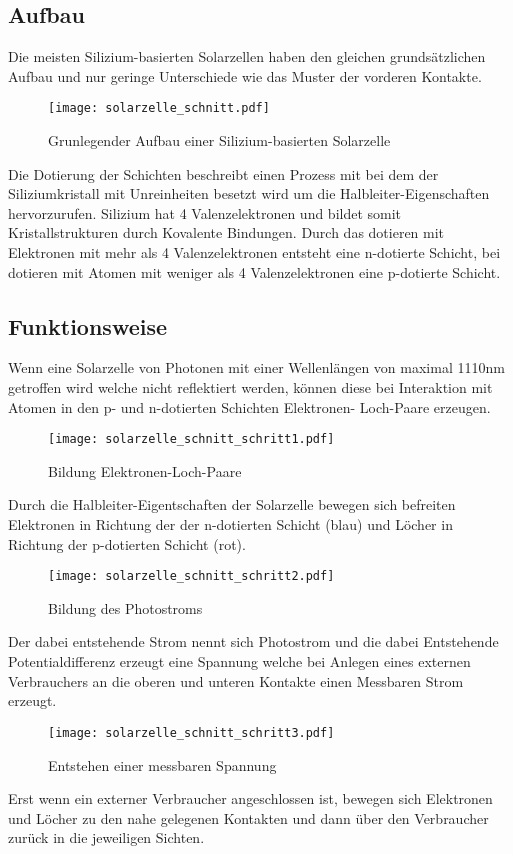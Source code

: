\subsection{Aufbau}
    Die meisten Silizium-basierten Solarzellen haben den gleichen
    grundsätzlichen Aufbau und nur geringe Unterschiede wie das Muster
    der vorderen Kontakte.
    \begin{figure}[H]
        \centering
        \texttt{[image: solarzelle\_schnitt.pdf]}
        \caption{Grunlegender Aufbau einer Silizium-basierten Solarzelle}
    \end{figure}
    Die Dotierung der Schichten beschreibt einen
    Prozess mit bei dem der Siliziumkristall mit Unreinheiten besetzt
    wird um die Halbleiter-Eigenschaften hervorzurufen. Silizium hat
    4 Valenzelektronen und bildet somit Kristallstrukturen durch Kovalente
    Bindungen. Durch das dotieren mit Elektronen mit mehr als 4
    Valenzelektronen entsteht eine n-dotierte Schicht, bei dotieren mit
    Atomen mit weniger als 4 Valenzelektronen eine p-dotierte Schicht.

\subsection{Funktionsweise}
    Wenn eine Solarzelle von Photonen mit einer Wellenlängen von maximal 1110nm
    getroffen wird welche nicht reflektiert werden, können diese bei
    Interaktion mit Atomen in den p- und n-dotierten Schichten Elektronen-
    Loch-Paare erzeugen.
    \begin{figure}[H]
        \centering
        \texttt{[image: solarzelle\_schnitt\_schritt1.pdf]}
        \caption{Bildung Elektronen-Loch-Paare}
    \end{figure}
    Durch die Halbleiter-Eigentschaften der Solarzelle bewegen sich befreiten
    Elektronen in Richtung der der n-dotierten Schicht (blau) und Löcher in
    Richtung der p-dotierten Schicht (rot).
    \begin{figure}[H]
        \centering
        \texttt{[image: solarzelle\_schnitt\_schritt2.pdf]}
        \caption{Bildung des Photostroms}
    \end{figure}
    Der dabei entstehende Strom nennt sich Photostrom und die dabei Entstehende
    Potentialdifferenz erzeugt eine Spannung welche bei Anlegen eines externen
    Verbrauchers an die oberen und unteren Kontakte einen Messbaren Strom
    erzeugt.
    \begin{figure}[H]
        \centering
        \texttt{[image: solarzelle\_schnitt\_schritt3.pdf]}
        \caption{Entstehen einer messbaren Spannung}
    \end{figure}
    Erst wenn ein externer Verbraucher angeschlossen ist, bewegen sich
    Elektronen und Löcher zu den nahe gelegenen Kontakten und dann über den
    Verbraucher zurück in die jeweiligen Sichten.

